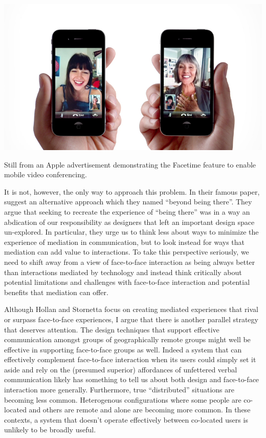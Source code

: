 \begin{marginfigure}
	\includegraphics{figures/iphone-face-to-face.png}
	\caption{Still from an Apple advertisement demonstrating the Facetime feature to enable mobile video conferencing.}
	\label{fig:facetime}
\end{marginfigure}

It is not, however, the only way to approach this problem. In their famous paper, \citet{Hollan:1992tz} suggest an alternative approach which they named ``beyond being there''. They argue that seeking to recreate the experience of ``being there'' was in a way an abdication of our responsibility as designers that left an important design space un-explored. In particular, they urge us to think less about ways to minimize the experience of mediation in communication, but to look instead for ways that mediation can add value to interactions. To take this perspective seriously, we need to shift away from a view of face-to-face interaction as being always better than interactions mediated by technology and instead think critically about potential limitations and challenges with face-to-face interaction and potential benefits that mediation can offer. 

Although Hollan and Stornetta focus on creating mediated experiences that rival or surpass face-to-face experiences, I argue that there is another parallel strategy that deserves attention. The design techniques that support effective communication amongst groups of geographically remote groups might well be effective in supporting face-to-face groups as well. Indeed a system that can effectively complement face-to-face interaction when its users could simply set it aside and rely on the (presumed superior) affordances of unfettered verbal communication likely has something to tell us about both design and face-to-face interaction more generally. Furthermore, true ``distributed'' situations are becoming less common. Heterogenous configurations where some people are co-located and others are remote and alone are becoming more common. In these contexts, a system that doesn't operate effectively between co-located users is unlikely to be broadly useful.




